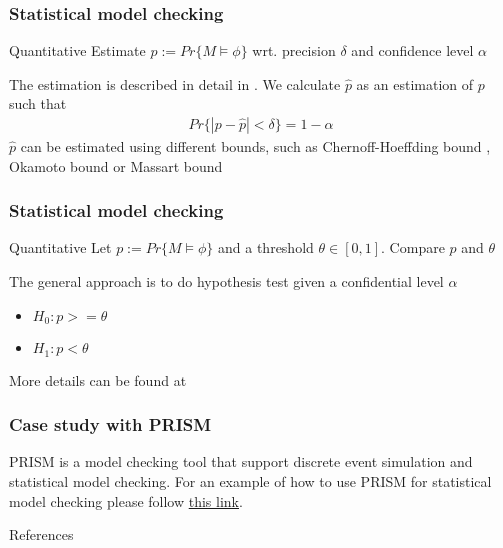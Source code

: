 \documentclass{beamer}
\begin{document}
\begin{frame}
    \frametitle{Statistical model checking}
    \begin{block}{Quantitative}
        Estimate $p:=Pr\{M \models \phi \}$ wrt. precision $\delta$ and confidence level $\alpha$
    \end{block}
    The estimation is described in detail in \cite{agha2018survey}. We calculate $\hat{p}$ as an estimation of $p$ such that
    \begin{align*}
        Pr\{ |p - \hat{p}| < \delta \} = 1 - \alpha
    \end{align*}
    $\hat{p}$ can be estimated using different bounds, such as Chernoff-Hoeffding bound \cite{hoeffding1963probability}, Okamoto bound \cite{okamoto1959some} or Massart bound \cite{massart1990tight}
\end{frame}

\begin{frame}
    \frametitle{Statistical model checking}
    \begin{block}{Quantitative}
        Let $p:=Pr\{M \models \phi \}$ and a threshold $\theta \in [0,1]$. Compare $p$ and $\theta$
    \end{block}
    The general approach is to do hypothesis test \cite{younes2005verification} given a confidential level $\alpha$
    \begin{itemize}
        \item $H_0: p >= \theta$
        \item $H_1: p < \theta$
    \end{itemize}
    More details can be found at \cite{wald1945sequential}
\end{frame}

\begin{frame}
    \frametitle{Case study with PRISM}
    PRISM \cite{kwiatkowska2002prism} is a model checking tool that support discrete event simulation and statistical model checking.
    For an example of how to use PRISM for statistical model checking please follow \href{https://www.prismmodelchecker.org/manual/RunningPRISM/StatisticalModelChecking}{this link}.
\end{frame}

\begin{frame}[allowframebreaks]{References}
    \printbibliography
\end{frame}
\end{document}
